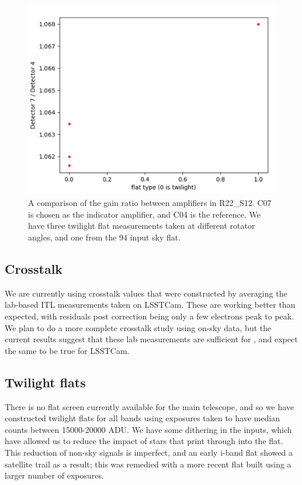 \begin{figure}
  \begin{center}
  \includegraphics[width=\textwidth]{figures/isr-f05-gain_ratios_by_flat.png}
  \caption{A comparison of the gain ratio between amplifiers in R22\_S12.  C07 is chosen as the indicator amplifier, and C04 is the reference.  We have three twilight flat measurements taken at different rotator angles, and one from the 94 input sky flat.}
  \end{center}
\end{figure}

\subsection{Crosstalk}

We are currently using crosstalk values that were constructed by averaging the lab-based ITL measurements taken on LSSTCam.
These are working better than expected, with residuals post correction being only a few electrons peak to peak.
We plan to do a more complete crosstalk study using on-sky data, but the current results suggest that these lab measurements are sufficient for \ComCam, and expect the same to be true for LSSTCam.

\subsection{Twilight flats}

There is no flat screen currently available for the main telescope, and so we have constructed twilight flats for all bands using exposures taken to have median counts between 15000-20000 ADU.
We have some dithering in the inputs, which have allowed us to reduce the impact of stars that print through into the flat.
This reduction of non-sky signals is imperfect, and an early i-band flat showed a satellite trail as a
result; this was remedied with a more recent flat built using a larger number of exposures.

